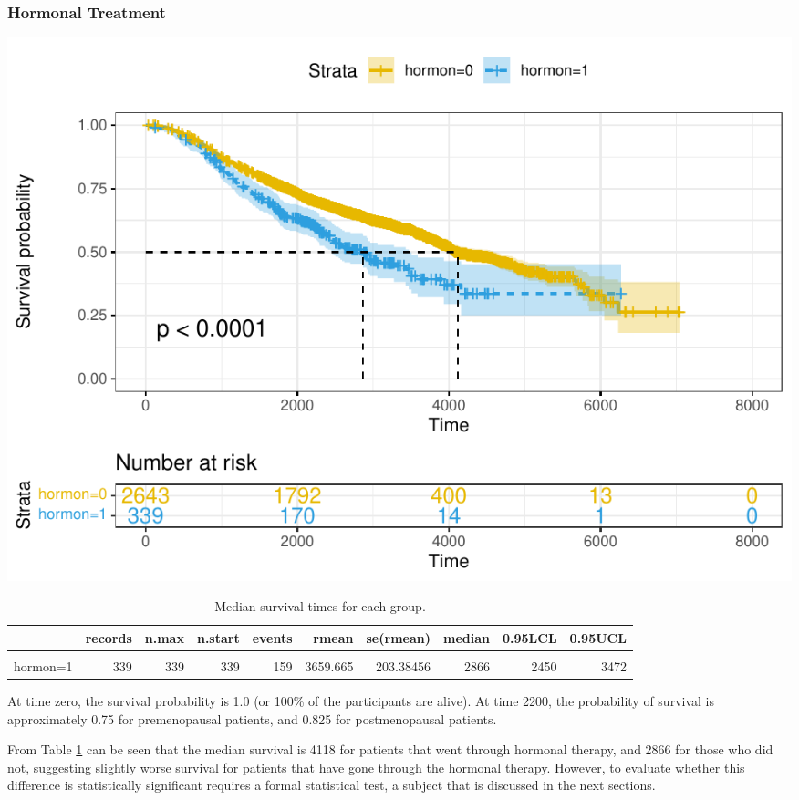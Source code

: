 \documentclass[
]{article}
\begin{document}
\subsubsection{Hormonal Treatment}

\begin{center}\includegraphics[width=0.85\linewidth,]{project_files/figure-latex/unnamed-chunk-7-1} \end{center}

\begin{table}[!h]

\caption{\label{tab:median-hormon}Median survival times for each group.}
\centering
\fontsize{8}{10}\selectfont
\begin{tabular}[t]{l|r|r|r|r|r|r|r|r|r}
\hline
  & records & n.max & n.start & events & rmean & se(rmean) & median & 0.95LCL & 0.95UCL\\
\hline
\cellcolor{gray!6}{hormon=0} & \cellcolor{gray!6}{2643} & \cellcolor{gray!6}{2643} & \cellcolor{gray!6}{2643} & \cellcolor{gray!6}{1113} & \cellcolor{gray!6}{4159.588} & \cellcolor{gray!6}{76.57099} & \cellcolor{gray!6}{4118} & \cellcolor{gray!6}{3988} & \cellcolor{gray!6}{4614}\\
\hline
hormon=1 & 339 & 339 & 339 & 159 & 3659.665 & 203.38456 & 2866 & 2450 & 3472\\
\hline
\end{tabular}
\end{table}

At time zero, the survival probability is 1.0 (or 100\% of the
participants are alive). At time 2200, the probability of survival is
approximately 0.75 for premenopausal patients, and 0.825 for
postmenopausal patients.

From Table \ref{tab:median-hormon} can be seen that the median survival is 4118 for patients that went through hormonal therapy, and 2866 for those who did not, suggesting slightly worse survival for patients that have gone through the hormonal therapy. However, to evaluate whether this difference is statistically significant requires a formal statistical test, a subject that is discussed in the next sections.
\end{document}
